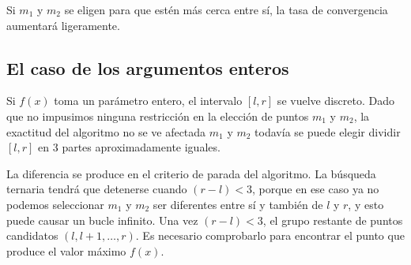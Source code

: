 Si $m_1$ y $m_2$ se eligen para que estén más cerca entre sí, la tasa de convergencia aumentará ligeramente.

\subsection{El caso de los argumentos enteros}
Si $f(x)$ toma un parámetro entero, el intervalo $[l,r]$ se vuelve discreto. Dado que 
no impusimos ninguna restricción en la elección de puntos $m_1$ y $m_2$, la exactitud 
del algoritmo no se ve afectada $m_1$ y $m_2$ todavía se puede elegir dividir $[l,r]$ 
en 3 partes aproximadamente iguales.

La diferencia se produce en el criterio de parada del algoritmo. La búsqueda ternaria 
tendrá que detenerse cuando $(r-l)<3$, porque en ese caso ya no podemos seleccionar 
$m_1$ y $m_2$ ser diferentes entre sí y también de $l$ y $r$, y esto puede causar un 
bucle infinito. Una vez $(r-l)<3$, el grupo restante de puntos candidatos $(l,l+1,\ldots,r)$. Es necesario comprobarlo para encontrar el punto que produce el valor máximo $f(x)$.